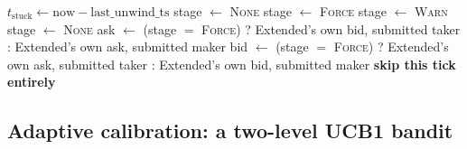 \documentclass[11pt,a4paper]{article}
\begin{document}
\begin{algorithm}[htbp]
\caption{Stuck-inventory circuit breaker}
\label{alg:unwind}
\begin{algorithmic}[1]
\State $t_{\text{stuck}} \gets \text{now} - \text{last\_unwind\_ts}$ 
 \State stage $\gets$ \textsc{None}
 \State stage $\gets$ \textsc{Force}
 \State stage $\gets$ \textsc{Warn}
\Else \State stage $\gets$ \textsc{None}
\EndIf
{}
   
     \State ask $\gets$ (stage $=$ \textsc{Force}) ? Extended's own bid, submitted taker
                        : Extended's own ask, submitted maker
  \Else {}
     \State bid $\gets$ (stage $=$ \textsc{Force}) ? Extended's own ask, submitted taker
                        : Extended's own bid, submitted maker
  \EndIf
\EndIf
{} \State \textbf{skip this tick entirely} 
\EndIf
\end{algorithmic}
\end{algorithm}

\subsection{Adaptive calibration: a two-level UCB1 bandit}
\label{sec:bandit}
\end{document}
